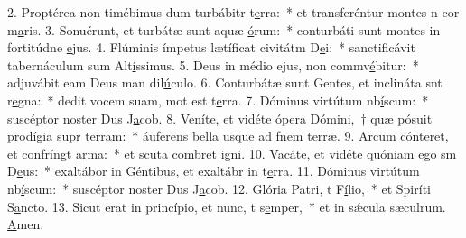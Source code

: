 2. Proptérea non timébimus dum turbábitr t\uline{e}rra:~* et transferéntur montes n cor m\uline{a}ris.
3. Sonuérunt, et turbátæ sunt aquæ \uline{ó}rum:~* conturbáti sunt montes in fortitúdne \uline{e}jus.
4. Flúminis ímpetus lætíficat civitátm D\uline{e}i:~* sanctificávit tabernáculum sum Alt\uline{í}ssimus.
5. Deus in médio ejus, non commv\uline{é}bitur:~* adjuvábit eam Deus man dil\uline{ú}culo.
6. Conturbátæ sunt Gentes, et inclináta snt r\uline{e}gna:~* dedit vocem suam, mot est t\uline{e}rra.
7. Dóminus virtútum nb\uline{í}scum:~* suscéptor noster Dus J\uline{a}cob.
8. Veníte, et vidéte ópera Dómini,~† quæ pósuit prodígia supr t\uline{e}rram:~* áuferens bella usque ad fnem t\uline{e}rræ.
9. Arcum cónteret, et confríngt \uline{a}rma:~* et scuta combret \uline{i}gni.
10. Vacáte, et vidéte quóniam ego sm D\uline{e}us:~* exaltábor in Géntibus, et exaltábr in t\uline{e}rra.
11. Dóminus virtútum nb\uline{í}scum:~* suscéptor noster Dus J\uline{a}cob.
12. Glória Patri, t F\uline{í}lio,~* et Spiríti S\uline{a}ncto.
13. Sicut erat in princípio, et nunc, t s\uline{e}mper,~* et in sǽcula sæculrum. \uline{A}men.
